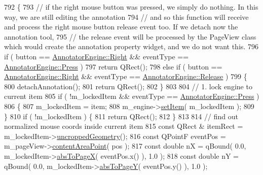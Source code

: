 \begin{DoxyCode}
792 \{
793     \textcolor{comment}{// if the right mouse button was pressed, we simply do nothing. In this way, we are still editing the
       annotation}
794     \textcolor{comment}{// and so this function will receive and process the right mouse button release event too. If we detach
       now the annotation tool,}
795     \textcolor{comment}{// the release event will be processed by the PageView class which would create the annotation property
       widget, and we do not want this.}
796     \textcolor{keywordflow}{if} ( button == \hyperlink{classAnnotatorEngine_ac2e3b75e12bacbb6974d15dd53954567a8c25b27f7e32e09ea9767d465de328a9}{AnnotatorEngine::Right} && eventType == 
      \hyperlink{classAnnotatorEngine_a00fb22eb4cb6eafb056f9066031db133a7f6f77a85d31dc6afd375db9a53d5069}{AnnotatorEngine::Press} )
797         \textcolor{keywordflow}{return} QRect();
798     \textcolor{keywordflow}{else} \textcolor{keywordflow}{if} ( button == \hyperlink{classAnnotatorEngine_ac2e3b75e12bacbb6974d15dd53954567a8c25b27f7e32e09ea9767d465de328a9}{AnnotatorEngine::Right} && eventType == 
      \hyperlink{classAnnotatorEngine_a00fb22eb4cb6eafb056f9066031db133ac80dbad38d0461d9e546aa694c2abc1c}{AnnotatorEngine::Release} )
799     \{
800         detachAnnotation();
801         \textcolor{keywordflow}{return} QRect();
802     \}
803 
804     \textcolor{comment}{// 1. lock engine to current item}
805     \textcolor{keywordflow}{if} ( !m\_lockedItem && eventType == \hyperlink{classAnnotatorEngine_a00fb22eb4cb6eafb056f9066031db133a7f6f77a85d31dc6afd375db9a53d5069}{AnnotatorEngine::Press} )
806     \{
807         m\_lockedItem = item;
808         m\_engine->\hyperlink{classAnnotatorEngine_aae312cd62f6fd4c9997a655d18de7385}{setItem}( m\_lockedItem );
809     \}
810     \textcolor{keywordflow}{if} ( !m\_lockedItem ) \{
811         \textcolor{keywordflow}{return} QRect();
812     \}
813 
814     \textcolor{comment}{// find out normalized mouse coords inside current item}
815     \textcolor{keyword}{const} QRect & itemRect = m\_lockedItem->\hyperlink{classPageViewItem_a5d2e73a003f65b4e95c0c21b1698f835}{uncroppedGeometry}();
816     \textcolor{keyword}{const} QPointF eventPos = m\_pageView->\hyperlink{classPageView_a7f432d3d6d05c69b568ad66a9c232cd7}{contentAreaPoint}( pos );
817     \textcolor{keyword}{const} \textcolor{keywordtype}{double} nX = qBound( 0.0, m\_lockedItem->\hyperlink{classPageViewItem_ac8c32541cbae1efd5b4ab54f0a4b4576}{absToPageX}( eventPos.x() ), 1.0 );
818     \textcolor{keyword}{const} \textcolor{keywordtype}{double} nY = qBound( 0.0, m\_lockedItem->\hyperlink{classPageViewItem_afdbba9ce015155c0e655efbb23e5d13b}{absToPageY}( eventPos.y() ), 1.0 );

\end{DoxyCode}
